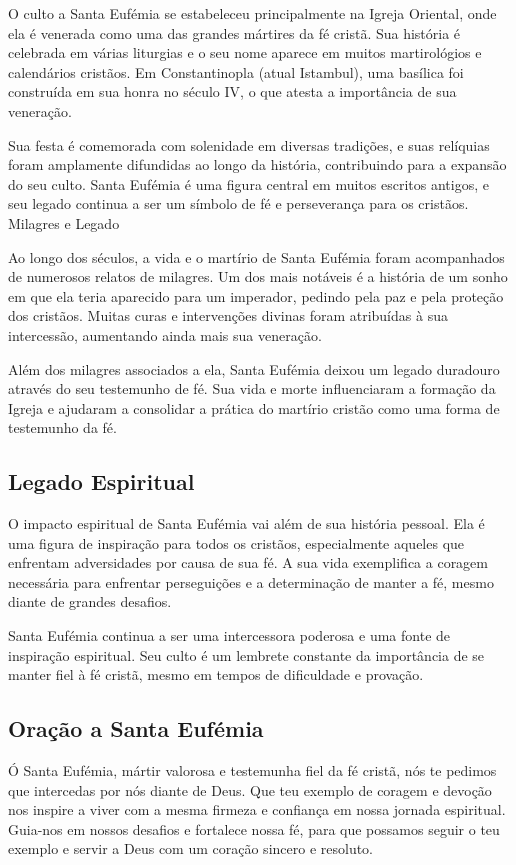 \documentclass[a4paper,14pt]{extarticle} \usepackage[utf8]{inputenc}
\begin{document}
O culto a Santa Eufémia se estabeleceu principalmente na Igreja Oriental, onde ela é venerada como uma das grandes mártires da fé cristã. Sua história é celebrada em várias liturgias e o seu nome aparece em muitos martirológios e calendários cristãos. Em Constantinopla (atual Istambul), uma basílica foi construída em sua honra no século IV, o que atesta a importância de sua veneração.

Sua festa é comemorada com solenidade em diversas tradições, e suas relíquias foram amplamente difundidas ao longo da história, contribuindo para a expansão do seu culto. Santa Eufémia é uma figura central em muitos escritos antigos, e seu legado continua a ser um símbolo de fé e perseverança para os cristãos.
Milagres e Legado

Ao longo dos séculos, a vida e o martírio de Santa Eufémia foram acompanhados de numerosos relatos de milagres. Um dos mais notáveis é a história de um sonho em que ela teria aparecido para um imperador, pedindo pela paz e pela proteção dos cristãos. Muitas curas e intervenções divinas foram atribuídas à sua intercessão, aumentando ainda mais sua veneração.

Além dos milagres associados a ela, Santa Eufémia deixou um legado duradouro através do seu testemunho de fé. Sua vida e morte influenciaram a formação da Igreja e ajudaram a consolidar a prática do martírio cristão como uma forma de testemunho da fé.

\subsection{Legado Espiritual}

O impacto espiritual de Santa Eufémia vai além de sua história pessoal. Ela é uma figura de inspiração para todos os cristãos, especialmente aqueles que enfrentam adversidades por causa de sua fé. A sua vida exemplifica a coragem necessária para enfrentar perseguições e a determinação de manter a fé, mesmo diante de grandes desafios.

Santa Eufémia continua a ser uma intercessora poderosa e uma fonte de inspiração espiritual. Seu culto é um lembrete constante da importância de se manter fiel à fé cristã, mesmo em tempos de dificuldade e provação.
\subsection{Oração a Santa Eufémia}

Ó Santa Eufémia, mártir valorosa e testemunha fiel da fé cristã, nós te pedimos que intercedas por nós diante de Deus. Que teu exemplo de coragem e devoção nos inspire a viver com a mesma firmeza e confiança em nossa jornada espiritual. Guia-nos em nossos desafios e fortalece nossa fé, para que possamos seguir o teu exemplo e servir a Deus com um coração sincero e resoluto.
\end{document}
